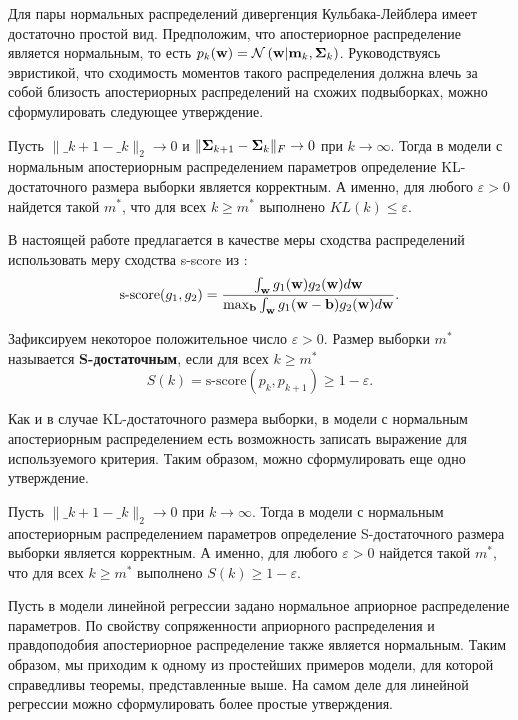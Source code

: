 Для пары нормальных распределений дивергенция Кульбака-Лейблера имеет достаточно простой вид. Предположим, что апостериорное распределение является нормальным, то есть $p_k(\mathbf{w}) = \mathcal{N}\left( \mathbf{w} | \mathbf{m}_k, \boldsymbol{\Sigma}_k \right)$. Руководствуясь эвристикой, что сходимость моментов такого распределения должна влечь за собой близость апостериорных распределений на схожих подвыборках, можно сформулировать следующее утверждение.

\begin{theorem}[Киселев, 2024]\label{theorem2}
    Пусть $\| \bm_{k+1} - \bm_k \|_2 \to 0$ и $\| \boldsymbol{\Sigma}_{k+1} - \boldsymbol{\Sigma}_k \|_{F} \to 0$ при $k \to \infty$. Тогда в модели с нормальным апостериорным распределением параметров определение KL-достаточного размера выборки является корректным. А именно, для любого $\varepsilon > 0$ найдется такой $m^*$, что для всех $k \geqslant m^*$ выполнено $KL(k) \leqslant \varepsilon$.
\end{theorem}

В настоящей работе предлагается в качестве меры сходства распределений использовать меру сходства s-score из \citep{Aduenko2017}:
\[ \text{s-score}(g_1, g_2) = \dfrac{\int_{\mathbf{w}} g_1(\mathbf{w}) g_2(\mathbf{w}) d\mathbf{w}}{\max_{\mathbf{b}} \int_{\mathbf{w}} g_1(\mathbf{w} - \mathbf{b}) g_2(\mathbf{w}) d\mathbf{w}}. \]

\begin{definition}
    Зафиксируем некоторое положительное число $\varepsilon > 0$. Размер выборки $m^*$ называется \textbf{S-достаточным}, если для всех $k \geqslant m^*$
    \[ S(k) = \text{s-score}(p_k, p_{k+1}) \geqslant 1-\varepsilon. \]
\end{definition}

Как и в случае KL-достаточного размера выборки, в модели с нормальным апостериорным распределением есть возможность записать выражение для используемого критерия. Таким образом, можно сформулировать еще одно утверждение.

\begin{theorem}[Киселев, 2024]\label{theorem3}
    Пусть $\| \bm_{k+1} - \bm_k \|_2 \to 0$ при $k \to \infty$. Тогда в модели с нормальным апостериорным распределением параметров определение S-достаточного размера выборки является корректным. А именно, для любого $\varepsilon > 0$ найдется такой $m^*$, что для всех $k \geqslant m^*$ выполнено $S(k) \geqslant 1-\varepsilon$.
\end{theorem}

Пусть в модели линейной регрессии задано нормальное априорное распределение параметров. По свойству сопряженности априорного распределения и правдоподобия апостериорное распределение также является нормальным. Таким образом, мы приходим к одному из простейших примеров модели, для которой справедливы теоремы, представленные выше. На самом деле для линейной регрессии можно сформулировать более простые утверждения.


